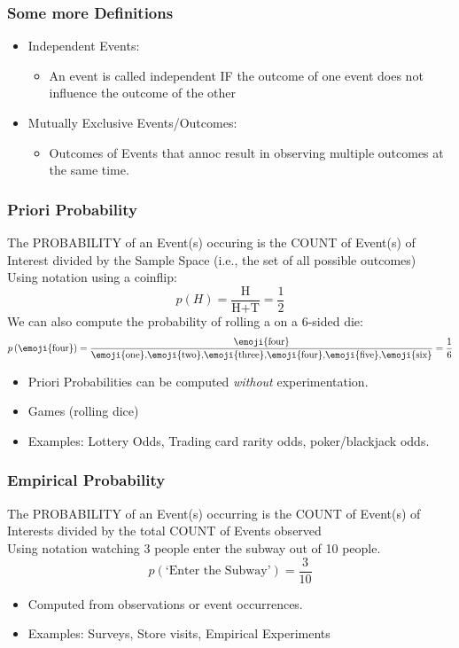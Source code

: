 \documentclass[12pt]{beamer}
\begin{document}
	\begin{frame}
		\frametitle{Some more Definitions}
		\begin{itemize}
			\item Independent Events:
			\begin{itemize}
				\item An event is called independent IF the outcome of one event does not influence the outcome of the other
		\end{itemize}
		 \item Mutually Exclusive Events/Outcomes:
		 	\begin{itemize}
		 		\item Outcomes of Events that annoc result in observing multiple outcomes at the same time. 
		 	\end{itemize}
		\end{itemize}
	\end{frame}
	\begin{frame}
		\frametitle{Priori Probability}
		The PROBABILITY of an Event(s) occuring is the COUNT of Event(s) of Interest divided by the Sample Space (i.e., the set of all possible outcomes) \\Using  notation using a coinflip:
		$$p(H) = \frac{\text{H}}{\text{H} + \text{T}} = \frac{1}{2}$$
		We can also compute the probability of rolling a  on a 6-sided die:
		$$p\left(\text{\emoji{four}}\right) = \frac{\text{\emoji{four}}}{\text{\emoji{one},\emoji{two},\emoji{three},\emoji{four},\emoji{five},\emoji{six}}} = \frac{1}{6}  $$
	\begin{itemize}
		\item Priori Probabilities can be computed \textit{without} experimentation.
		\item Games (rolling dice)
		\item Examples: Lottery Odds, Trading card rarity odds, poker/blackjack odds.
	\end{itemize}
	\end{frame}
	\begin{frame}
		\frametitle{Empirical Probability}
		The PROBABILITY of an Event(s) occurring is the COUNT of Event(s) of Interests divided by the total COUNT of Events observed
		\\Using notation watching 3 people enter the subway out of 10 people. 
		$$ p(\text{`Enter the Subway'}) = \frac{3}{10}$$ 
		\begin{itemize}
			\item Computed from observations or event occurrences. 
			\item Examples: Surveys, Store visits, Empirical Experiments
		\end{itemize}
		\end{frame}
\end{document}
